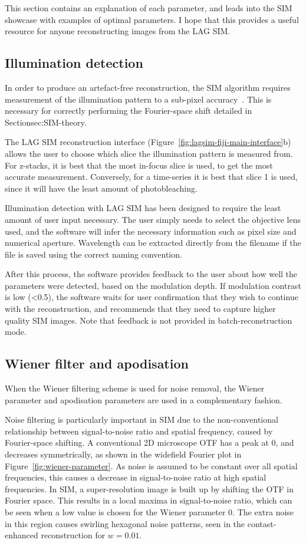 This section contains an explanation of each parameter, and leads into the SIM showcase with examples of optimal parameters.
I hope that this provides a useful resource for anyone reconstructing images from the LAG SIM. 

\subsection{Illumination detection}
In order to produce an artefact-free reconstruction, the SIM algorithm requires measurement of the illumination pattern to a sub-pixel accuracy~\cite{muller2016open}. 
This is necessary for correctly performing the Fourier-space shift detailed in Section{sec:SIM-theory}. 

The LAG SIM reconstruction interface (Figure~\ref{fig:lagsim-fiji-main-interface}b) allows the user to choose which slice the illumination pattern is measured from. 
For z-stacks, it is best that the most in-focus slice is used, to get the most accurate measurement. 
Conversely, for a time-series it is best that slice 1 is used, since it will have the least amount of photobleaching. 

Illumination detection with LAG SIM has been designed to require the least amount of user input necessary. 
The user simply needs to select the objective lens used, and the software will infer the necessary information such as pixel size and numerical aperture. 
Wavelength can be extracted directly from the filename if the file is saved using the correct naming convention. 

After this process, the software provides feedback to the user about how well the parameters were detected, based on the modulation depth. 
If modulation contrast is low (<0.5), the software waits for user confirmation that they wish to continue with the reconstruction, and recommends that they need to capture higher quality SIM images. 
Note that feedback is not provided in batch-reconstruction mode. 

\subsection{Wiener filter and apodisation}
When the Wiener filtering scheme is used for noise removal, the Wiener parameter and apodisation parameters are used in a complementary fashion. 

Noise filtering is particularly important in SIM due to the non-conventional relationship between signal-to-noise ratio and spatial frequency, caused by Fourier-space shifting. 
A conventional 2D microscope OTF has a peak at 0, and decreases symmetrically, as shown in the widefield Fourier plot in Figure~\ref{fig:wiener-parameter}. 
As noise is assumed to be constant over all spatial frequencies, this causes a decrease in signal-to-noise ratio at high spatial frequencies. 
In SIM, a super-resolution image is built up by shifting the OTF in Fourier space. 
This results in a local maxima in signal-to-noise ratio, which can be seen when a low value is chosen for the Wiener parameter 0. 
The extra noise in this region causes swirling hexagonal noise patterns, seen in the contast-enhanced reconstruction for $w=0.01$. 

